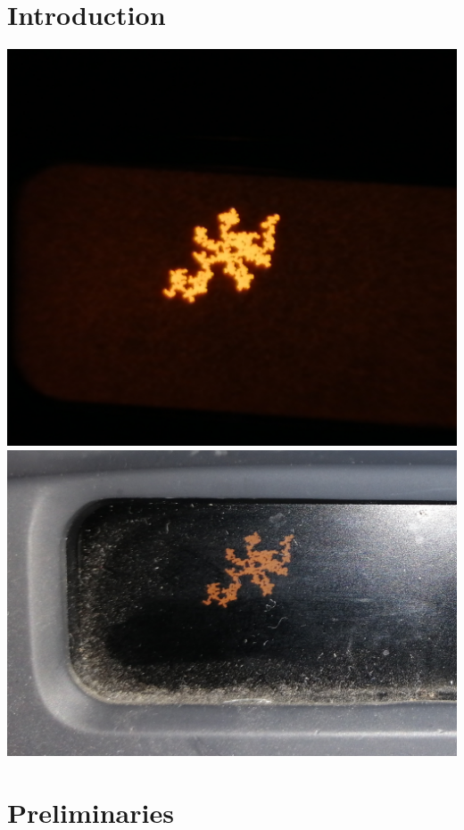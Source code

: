 \documentclass[12pt,a4paper]{scrartcl}
\numberwithin{equation}{subsection}
\newcommand{\1}{\mathbbm{1}}
\numberwithin{equation}{section}
\theoremstyle{definition}
\begin{document}
\section{Introduction}
\includegraphics[scale=0.04]{images/display.jpg} 
\includegraphics[scale=0.091]{images/display2.jpg}





\newpage


\section{Preliminaries} \label{prelim}
\end{document}
